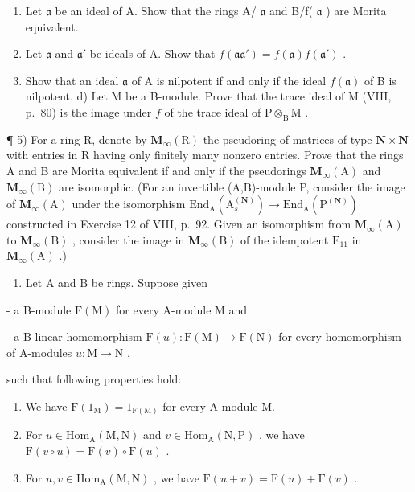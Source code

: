 \begin{enumerate}
\def\labelenumi{\alph{enumi})}
\item
  Let \(\mathfrak{a}\) be an ideal of A. Show that the rings A/ \(\mathfrak{a}\) and B/f( \(\mathfrak{a}\) ) are Morita equivalent.
\item
  Let \(\mathfrak{a}\) and \(\mathfrak{a}'\) be ideals of A. Show that \(f(\mathfrak{aa}') = f(\mathfrak{a})f(\mathfrak{a}')\) .
\item
  Show that an ideal \(\mathfrak{a}\) of A is nilpotent if and only if the ideal \(f(\mathfrak{a})\) of B is nilpotent. d) Let M be a B-module. Prove that the trace ideal of M (VIII, p.~80) is the image under \(f\) of the trace ideal of \(\mathrm{P} \otimes_{\mathrm{B}} \mathrm{M}\) .
\end{enumerate}

¶ 5) For a ring R, denote by \(\mathbf{M}_{\infty}(\mathrm{R})\) the pseudoring of matrices of type \(\mathbf{N} \times \mathbf{N}\) with entries in R having only finitely many nonzero entries. Prove that the rings A and B are Morita equivalent if and only if the pseudorings \(\mathbf{M}_{\infty}(\mathrm{A})\) and \(\mathbf{M}_{\infty}(\mathrm{B})\) are isomorphic. (For an invertible (A,B)-module P, consider the image of \(\mathbf{M}_{\infty}(\mathrm{A})\) under the isomorphism \(\mathrm{End}_{\mathrm{A}}(\mathrm{A}_{s}^{(\mathbf{N})}) \to \mathrm{End}_{\mathrm{A}}(\mathrm{P}^{(\mathbf{N})})\) constructed in Exercise 12 of VIII, p.~92. Given an isomorphism from \(\mathbf{M}_{\infty}(\mathrm{A})\) to \(\mathbf{M}_{\infty}(\mathrm{B})\) , consider the image in \(\mathbf{M}_{\infty}(\mathrm{B})\) of the idempotent \(\mathrm{E}_{11}\) in \(\mathbf{M}_{\infty}(\mathrm{A})\) .)

\begin{enumerate}
\def\labelenumi{\arabic{enumi})}
\setcounter{enumi}{5}
\tightlist
\item
  Let \(\mathrm{A}\) and \(\mathrm{B}\) be rings. Suppose given
\end{enumerate}

- a B-module \(\mathrm{F(M)}\) for every A-module M and

- a B-linear homomorphism \(\mathrm{F}(u): \mathrm{F}(\mathrm{M}) \to \mathrm{F}(\mathrm{N})\) for every homomorphism of A-modules \(u: \mathrm{M} \to \mathrm{N}\) ,

such that following properties hold:

\begin{enumerate}
\def\labelenumi{(\roman{enumi})}
\item
  We have \(\mathrm{F}(1_{\mathrm{M}}) = 1_{\mathrm{F(M)}}\) for every A-module M.
\item
  For \(u \in \mathrm{Hom}_{\mathrm{A}}(\mathrm{M}, \mathrm{N})\) and \(v \in \mathrm{Hom}_{\mathrm{A}}(\mathrm{N}, \mathrm{P})\) , we have \(\mathrm{F}(v \circ u) = \mathrm{F}(v) \circ \mathrm{F}(u)\) .
\item
  For \(u, v \in \mathrm{Hom}_{\mathrm{A}}(\mathrm{M}, \mathrm{N})\) , we have \(\mathrm{F}(u + v) = \mathrm{F}(u) + \mathrm{F}(v)\) .
\end{enumerate}

